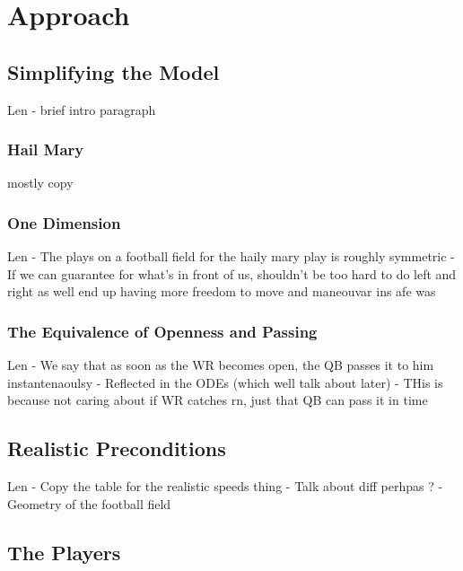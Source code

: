 \newpage


\section{Approach}

\blindtext

\subsection{Simplifying the Model}

Len
- brief intro paragraph

\subsubsection{Hail Mary}

mostly copy

\subsubsection{One Dimension}

Len
- The plays on a football field for the haily mary play is roughly symmetric
- If we can guarantee for what's in front of us, shouldn't be too hard to do left and right
  as well end up having more freedom to move and maneouvar ins afe was

\subsubsection{The Equivalence of Openness and Passing}

Len
- We say that as soon as the WR becomes open, the QB passes it to him instantenaoulsy
- Reflected in the ODEs (which well talk about later) 
- THis is because not caring about if WR catches rn, just that QB can pass it in time

\subsection{Realistic Preconditions}

Len 
- Copy the table for the realistic speeds thing
- Talk about diff perhpas ? 
- Geometry of the football field

\subsection{The Players}

